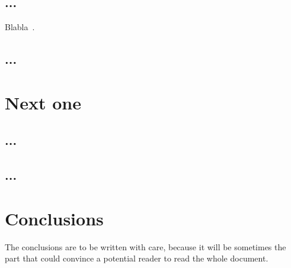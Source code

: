 \documentclass[11pt,a4paper,oneside]{book}
\begin{document}
\label{chap2}

\section{...}Blabla~\cite{ref4}.

\section{...}
\label{sec-untel}

\chapter{Next one}

\section{...}

\section{...}

\chapter*{Conclusions}

The conclusions are to be written with care, because it will be sometimes the part that could convince a potential reader to read the whole document.

\appendix

\backmatter

\printindex %


\end{document}
